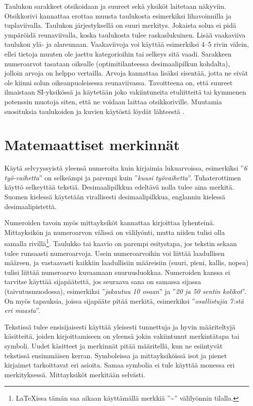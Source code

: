 \documentclass[globalnumbering,centeredcaptions]{tutthesis/tutthesis} %
\begin{document}
Taulukon sarakkeet otsikoidaan ja suureet sekä yksiköt laitetaan näkyviin.
Otsikkorivi kannattaa erottaa muusta taulukosta esimerkiksi lihavoinnilla ja tuplaviivalla.
Taulukon järjestyksellä on suuri merkitys. Jokaista solua ei pidä ympäröidä reunaviivalla, koska taulukosta tulee raskaslukuinen.
Lisää vaakaviiva taulukon ylä- ja alareunaan. Vaakaviivoja voi käyttää esimerkiksi 4–5 rivin välein, ellei tietoja muuten ole jaettu kategorioihin tai selkeys sitä vaadi. Sarakkeen numeroarvot tasataan oikealle (optimitilanteessa desimaalipilkun kohdalta), jolloin arvoja on helppo vertailla.
Arvoja kannattaa lisäksi sisentää, jotta ne eivät ole kiinni solun oikeanpuoleisessa reunaviivassa.
Tavoitteena on, että suureet ilmaistaan SI-yksikössä ja käytetään joko vakiintuneita etuliitteitä tai kymmenen potenssin muotoja siten, että ne voidaan laittaa otsikkoriville. Muutamia suosituksia taulukoiden ja kuvien käytöstä löydät lähteestä \citep{Salminen2012}.

\section{Matemaattiset merkinnät}

Käytä selvyyssyistä yleensä numeroita kuin kirjaimia lukuarvoissa, esimerkiksi ''\emph{6 työ-vaihetta}'' on selkeämpi ja parempi kuin ''\emph{kuusi työvaihetta}''.
Tuhaterottimen käyttö selkeyttää tekstiä.
Desimaalipilkkua edeltävä nolla tulee aina merkitä.
Suomen kielessä käytetään virallisesti desimaalipilkkua, englannin kielessä desimaalipistettä.

Numeroiden tavoin myös mittayksiköt kannattaa kirjoittaa lyhenteinä.
Mittayksikön ja numeroarvon välissä on välilyönti, mutta niiden tulisi olla samalla rivillä\footnote{LaTeXissa tämän saa aikaan käyttämällä merkkiä ''\textasciitilde'' välilyönnin tilalla.}.
Taulukko tai kaavio on parempi esitystapa, jos tekstin sekaan tulee runsaasti numeroarvoja.
Usein numeroarvoihin voi liittää laadullisen määreen, ja vastaavasti kaikkiin laadullisiin määreisiin (suuri, pieni, kallis, nopea) tulisi liittää numeroarvo kuvaamaan suuruusluokkaa.
Numeroiden kanssa ei tarvitse käyttää sijapäätettä, jos seuraava sana on samassa sijassa (taivutusmuodossa), esimerkiksi ''\emph{jakautuu 10 osaan}'' ja ''\emph{20 ja 50 sentin kolikot}''.
On myös tapauksia, joissa sijapääte pitää merkitä, esimerkiksi ''\emph{osallistujia 7:stä eri maasta}''.

Tekstissä tulee ensisijaisesti käyttää yleisesti tunnettuja ja hyvin määriteltyjä käsitteitä, joiden kirjoittamiseen on yleensä jokin vakiintunut merkintätapa tai symboli.
Uudet käsitteet ja merkinnät pitää määritellä, kun ne esiintyvät tekstissä ensimmäisen kerran.
Symboleissa ja mittayksiköissä isot ja pienet kirjaimet tarkoittavat eri asioita.
Samaa symbolia ei tule käyttää monessa eri merkityksessä.
Mittayksiköt merkitään selvästi.
\end{document}
